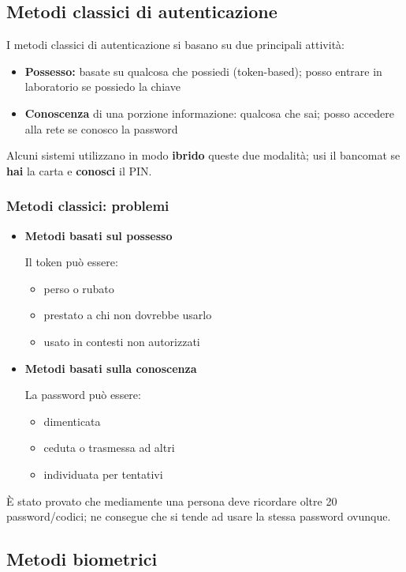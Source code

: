 \subsection{Metodi classici di autenticazione}
I metodi classici di autenticazione si basano su due principali attività:
\begin{itemize}
    \item \textbf{Possesso:} basate su qualcosa che possiedi (token-based); posso entrare in laboratorio se possiedo la chiave
    \item \textbf{Conoscenza} di una porzione informazione: qualcosa che sai; posso accedere alla rete se conosco la password
\end{itemize}
Alcuni sistemi utilizzano in modo \textbf{ibrido} queste due modalità; usi il bancomat se \textbf{hai} la carta e \textbf{conosci} il PIN.

\subsubsection{Metodi classici: problemi}

\begin{itemize}
    \item  \textbf{Metodi basati sul possesso}
    
    Il token può essere:
    \begin{itemize}
        \item perso o rubato
        \item prestato a chi non dovrebbe usarlo
        \item usato in contesti non autorizzati
    \end{itemize}
    \item \textbf{Metodi basati sulla conoscenza}
    
    La password può essere:
    \begin{itemize}
        \item dimenticata
        \item ceduta o trasmessa ad altri
        \item individuata per tentativi
    \end{itemize}
\end{itemize}

\noindent È stato provato che mediamente una persona deve ricordare oltre 20 password/codici; ne consegue che si tende ad usare la stessa password ovunque.

\subsection{Metodi biometrici}

